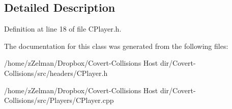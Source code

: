 \subsection{Detailed Description}


Definition at line 18 of file C\-Player.\-h.



The documentation for this class was generated from the following files\-:\begin{DoxyCompactItemize}
\item 
/home/z\-Zelman/\-Dropbox/\-Covert-\/\-Collisions Host dir/\-Covert-\/\-Collisions/src/headers/C\-Player.\-h\item 
/home/z\-Zelman/\-Dropbox/\-Covert-\/\-Collisions Host dir/\-Covert-\/\-Collisions/src/\-Players/C\-Player.\-cpp\end{DoxyCompactItemize}
